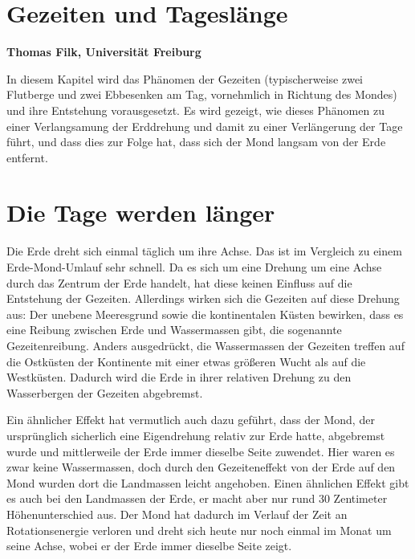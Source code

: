 

\setcounter{page}{1}
\setcounter{section}{0}
\setcounter{figure}{0}
\setcounter{equation}{0}
\setcounter{table}{0}
\setcounter{footnote}{0}

\section*{Gezeiten und Tagesl\"ange}
\vspace{0.2cm}
\noindent
{\bf Thomas Filk, Universit\"at Freiburg}
\vspace{1cm}

\label{chap_Gezeiten2}
\noindent
In diesem Kapitel wird das Ph\"anomen der Gezeiten (typischerweise zwei Flutberge
und zwei Ebbesenken am Tag, vornehmlich in Richtung des Mondes) und ihre
Entstehung vorausgesetzt. Es wird gezeigt, wie dieses Ph\"anomen zu einer Verlangsamung
der Erddrehung und damit zu einer Verl\"angerung der Tage f\"uhrt, und dass dies
zur Folge hat, dass sich der Mond langsam von der Erde entfernt. 
 

\section{Die Tage werden l\"anger}
\label{sec_EMWW}

Die Erde dreht sich einmal t\"aglich um ihre Achse. Das ist im Vergleich zu einem
Erde-Mond-Umlauf sehr schnell. Da es sich um eine Drehung um eine Achse durch
das Zentrum der Erde handelt, hat diese keinen Einfluss auf die Entstehung der Gezeiten. 
Allerdings wirken sich die Gezeiten auf diese Drehung aus: Der unebene Meeresgrund
sowie die kontinentalen K\"usten bewirken, dass es eine Reibung zwischen Erde und
Wassermassen gibt, die sogenannte Gezeitenreibung. 
Anders ausgedr\"uckt, die Wassermassen der Gezeiten treffen
auf die Ostk\"usten der Kontinente mit einer etwas gr\"o\ss eren Wucht als auf die
Westk\"usten. Dadurch wird die Erde in ihrer relativen Drehung zu den Wasserbergen
der Gezeiten abgebremst. 

Ein \"ahnlicher Effekt hat vermutlich auch dazu gef\"uhrt, dass der Mond, der urspr\"unglich
sicherlich eine Eigendrehung relativ zur Erde hatte, abgebremst wurde und mittlerweile
der Erde immer dieselbe Seite zuwendet. Hier waren es zwar keine Wassermassen, doch
durch den Gezeiteneffekt von der Erde auf den Mond wurden dort die Landmassen
leicht angehoben. Einen \"ahnlichen Effekt gibt es auch bei den Landmassen der Erde, er
macht aber nur rund 30 Zentimeter H\"ohenunterschied aus. Der Mond hat dadurch im
Verlauf der Zeit an Rotationsenergie verloren und dreht sich heute nur noch einmal im
Monat um seine Achse, wobei er der Erde immer dieselbe Seite zeigt.

